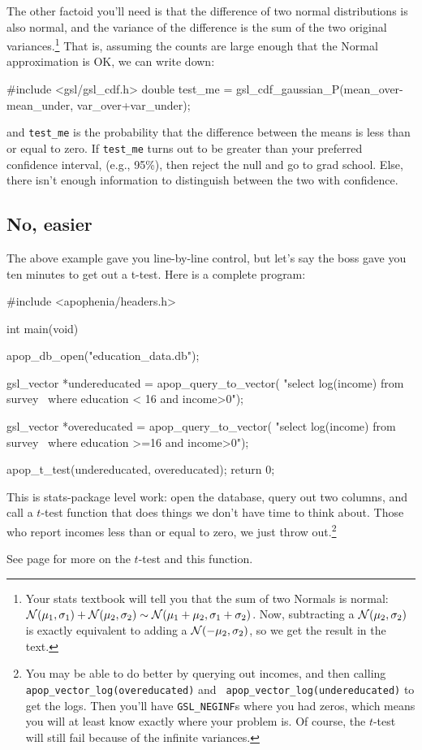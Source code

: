 The other factoid you'll need is that the difference of two normal
distributions is also normal, and the variance of the difference is
the sum of the two original variances.\footnote{Your stats textbook
will tell you that the sum of two Normals is normal: ${\cal N}(\mu_1,
\sigma_1) + {\cal N}(\mu_2, \sigma_2) \sim {\cal N}(\mu_1 + \mu_2,
\sigma_1 + \sigma_2)$. Now, subtracting a ${\cal N}(\mu_2, \sigma_2)$
is exactly equivalent to adding a ${\cal N}(-\mu_2, \sigma_2)$, so we
get the result in the text.} That is, assuming the counts are large
enough that the Normal approximation is OK, we can write down:

#include <gsl/gsl_cdf.h>
double	test_me = gsl_cdf_gaussian_P(mean_over-mean_under, 
                                       var_over+var_under);

and {\tt test\_me} is the probability that the difference between the
means is less than or equal to zero. If {\tt test\_me} turns out to be greater
than your preferred confidence interval, (e.g., 95\%), then reject the
null and go to grad school. Else, there isn't enough information to
distinguish between the two with confidence.

\subsection{No, easier} The above example gave you line-by-line
control, but let's say the boss gave you ten minutes to get out a
t-test. Here is a complete program:

#include <apophenia/headers.h>

int main(void){
    apop_db_open("education_data.db");

    gsl_vector	*undereducated = apop_query_to_vector(
      "select log(income) from survey \
      where education < 16 and income>0");

    gsl_vector	*overeducated = apop_query_to_vector(
      "select log(income) from survey \
      where education >=16 and income>0");

    apop_t_test(undereducated, overeducated);
    return 0;
}

This is stats-package level work: open the database, query out two
columns, and call a $t$-test function that does things
we don't have time to think about. Those who report incomes less than or
equal to zero, we just throw out.\footnote{You may be able to do better
by querying out incomes, and then calling
    {\tt apop\_vector\_log(overeducated)} and {\tt
    apop\_vector\_log(undereducated)} to get the logs. Then you'll have
    {\tt GSL\_NEGINF}s where you had zeros, which means you will at least
    know exactly where your problem is. Of course, the $t$-test will
    still fail because of the infinite variances.}

See page \pageref{ttest} for more on the $t$-test and this function.


